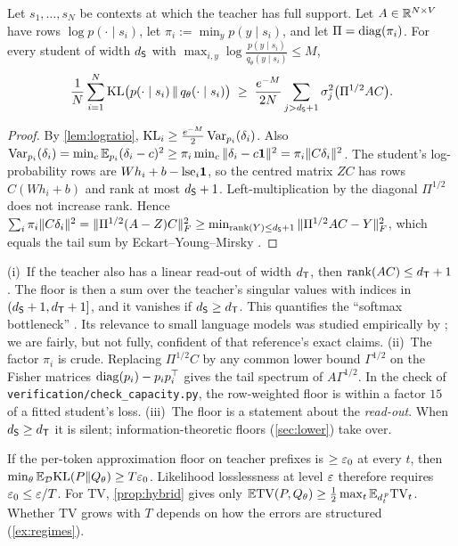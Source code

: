 \begin{theorem}\label{thm:bottleneck}
\Ck Let $s_1,\dots,s_N$ be contexts at which the teacher has full support. Let
$A\in\mathbb{R}^{N\times V}$ have rows $\log p(\cdot\mid s_i)$, let $\pi_i:=\min_yp(y\mid s_i)$, and let
$\Pi=\operatorname{diag}(\pi_i)$. For every student of width $d_{\mathsf{S}}$ with $\max_{i,y}\log\frac{p(y\mid s_i)}{q_\theta(y\mid s_i)}\le M$,
\[
\frac1N\sum_{i=1}^N\mathrm{KL}\big(p(\cdot\mid s_i)\,\|\,q_\theta(\cdot\mid s_i)\big)\;\ge\;\frac{e^{-M}}{2N}\sum_{j>d_{\mathsf{S}}+1}\sigma_j^2\big(\Pi^{1/2}AC\big).
\]
\end{theorem}
\begin{proof}
By \cref{lem:logratio}, $\mathrm{KL}_i\ge\frac{e^{-M}}2\operatorname{Var}_{p_i}(\delta_i)$. Also
$\operatorname{Var}_{p_i}(\delta_i)=\min_c\mathbb{E}_{p_i}(\delta_i-c)^2\ge\pi_i\min_c\|\delta_i-c\mathbf{1}\|^2=\pi_i\|C\delta_i\|^2$.
The student's log-probability rows are $Wh_i+b-\mathrm{lse}_i\mathbf{1}$, so the centred matrix $ZC$ has rows
$C(Wh_i+b)$ and rank at most $d_{\mathsf{S}}+1$. Left-multiplication by the diagonal $\Pi^{1/2}$ does not
increase rank. Hence
$\sum_i\pi_i\|C\delta_i\|^2=\|\Pi^{1/2}(A-Z)C\|_F^2\ge\min_{\operatorname{rank}(Y)\le d_{\mathsf{S}}+1}\|\Pi^{1/2}AC-Y\|_F^2$, which
equals the tail sum by Eckart--Young--Mirsky \citep{eckart1936approximation}.
\end{proof}

\begin{remark}\label{rem:bottleneck}
(i)~If the teacher also has a linear read-out of width $d_{\mathsf{T}}$, then $\operatorname{rank}(AC)\le d_{\mathsf{T}}+1$. The floor is
then a sum over the teacher's singular values with indices in $(d_{\mathsf{S}}+1,d_{\mathsf{T}}+1]$, and it vanishes if
$d_{\mathsf{S}}\ge d_{\mathsf{T}}$. This quantifies the ``softmax bottleneck'' \citep{yang2018breaking}. Its relevance to
small language models was studied empirically by \citet{godey2024small}; we are fairly, but not fully,
confident of that reference's exact claims.
(ii)~The factor $\pi_i$ is crude. Replacing $\Pi^{1/2}C$ by any common lower bound $\Gamma^{1/2}$ on the
Fisher matrices $\operatorname{diag}(p_i)-p_ip_i^\top$ gives the tail spectrum of $A\Gamma^{1/2}$. In the check of
\texttt{verification/check\_capacity.py}, the row-weighted floor is within a factor $15$ of a fitted
student's loss.
(iii)~The floor is a statement about the \emph{read-out}. When $d_{\mathsf{S}}\ge d_{\mathsf{T}}$ it is silent;
information-theoretic floors (\cref{sec:lower}) take over.
\end{remark}

\begin{corollary}\label{cor:approx-T}
\Pv If the per-token approximation floor on teacher prefixes is $\ge\varepsilon_0$ at every $t$, then
$\min_\theta\mathbb{E}_{\mathcal{D}}\mathrm{KL}(P\|Q_\theta)\ge T\varepsilon_0$. Likelihood losslessness at level $\varepsilon$ therefore requires
$\varepsilon_0\le\varepsilon/T$. For TV, \cref{prop:hybrid} gives only $\mathbb{E}\mathrm{TV}(P,Q_\theta)\ge\frac12\max_t\mathbb{E}_{d^{\,p}_{t}}\mathrm{TV}_t$.
Whether TV grows with $T$ depends on how the errors are structured (\cref{ex:regimes}).
\end{corollary}

